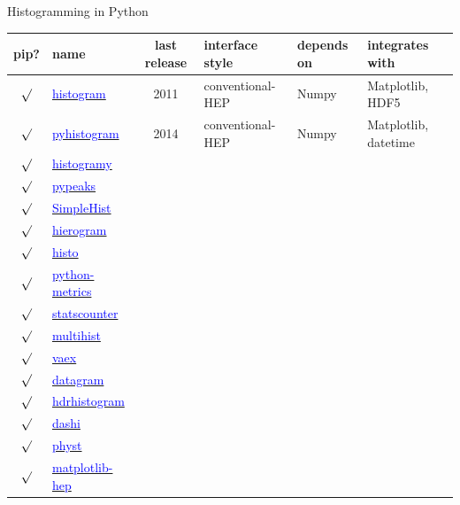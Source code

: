 \documentclass[aspectratio=169]{beamer}
\begin{document}
\begin{frame}{Histogramming in Python}
\scriptsize
\vspace{0.25 cm}
\begin{tabular}{c l c p{2.5 cm} p{1.5 cm} p{4 cm}}
pip? & name & last release & interface style & depends on & integrates with \\\hline
$\surd$ & \href{https://pypi.python.org/pypi/histogram}{\textcolor{blue}{histogram}} & 2011 & conventional-HEP & Numpy & Matplotlib, HDF5 \\
$\surd$ & \href{https://pypi.python.org/pypi/pyhistogram}{\textcolor{blue}{pyhistogram}} & 2014 & conventional-HEP & Numpy & Matplotlib, datetime \\
$\surd$ & \href{https://pypi.python.org/pypi/histogramy}{\textcolor{blue}{histogramy}} & & & & \\
$\surd$ & \href{https://pypi.python.org/pypi/pypeaks}{\textcolor{blue}{pypeaks}} & & & & \\
$\surd$ & \href{https://pypi.python.org/pypi/SimpleHist}{\textcolor{blue}{SimpleHist}} & & & & \\
$\surd$ & \href{https://pypi.python.org/pypi/hierogram}{\textcolor{blue}{hierogram}} & & & & \\
$\surd$ & \href{https://pypi.python.org/pypi/histo}{\textcolor{blue}{histo}} & & & & \\
$\surd$ & \href{https://pypi.python.org/pypi/python-metrics}{\textcolor{blue}{python-metrics}} & & & & \\
$\surd$ & \href{https://pypi.python.org/pypi/statscounter}{\textcolor{blue}{statscounter}} & & & & \\
$\surd$ & \href{https://pypi.python.org/pypi/multihist}{\textcolor{blue}{multihist}} & & & & \\
$\surd$ & \href{https://pypi.python.org/pypi/vaex}{\textcolor{blue}{vaex}} & & & & \\
$\surd$ & \href{https://pypi.python.org/pypi/datagram}{\textcolor{blue}{datagram}} & & & & \\
$\surd$ & \href{https://pypi.python.org/pypi/hdrhistogram}{\textcolor{blue}{hdrhistogram}} & & & & \\
$\surd$ & \href{http://www.ifh.de/~middell/dashi/index.html}{\textcolor{blue}{dashi}} & & & & \\
$\surd$ & \href{https://pypi.python.org/pypi/physt}{\textcolor{blue}{physt}} & & & & \\
$\surd$ & \href{https://github.com/ibab/matplotlib-hep}{\textcolor{blue}{matplotlib-hep}} & & & & \\

\end{tabular}
\end{frame}
\end{document}
